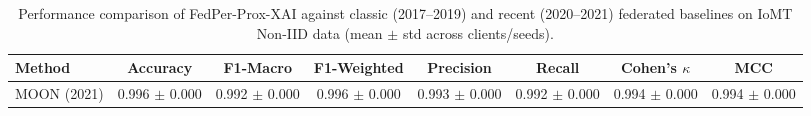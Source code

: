 \begin{table}[t]
\centering
\caption{Performance comparison of FedPer-Prox-XAI against classic (2017--2019) and recent (2020--2021) federated baselines on IoMT Non-IID data (mean $\pm$ std across clients/seeds).}
\label{tab:sota_comparison}
\begin{tabular}{lccccccc}
\toprule
Method & Accuracy & F1-Macro & F1-Weighted & Precision & Recall & Cohen's $\kappa$ & MCC \\
\midrule
MOON (2021) & 0.996 $\pm$ 0.000 & 0.992 $\pm$ 0.000 & 0.996 $\pm$ 0.000 & 0.993 $\pm$ 0.000 & 0.992 $\pm$ 0.000 & 0.994 $\pm$ 0.000 & 0.994 $\pm$ 0.000 \\
\bottomrule
\end{tabular}
\end{table}
